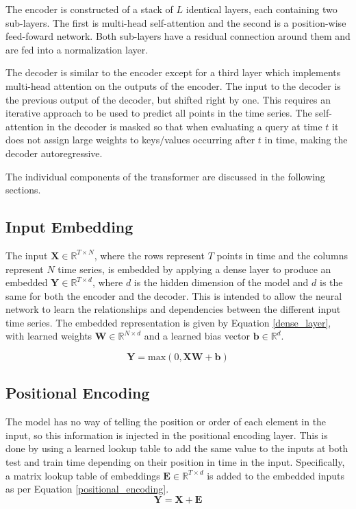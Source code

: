 The encoder is constructed of a stack of $L$ identical layers, each containing two sub-layers.
The first is multi-head self-attention and the second is a position-wise feed-foward network.
Both sub-layers have a residual connection around them and are fed into a normalization layer.

The decoder is similar to the encoder except for a third layer which implements multi-head attention on the outputs of the encoder.
The input to the decoder is the previous output of the decoder, but shifted right by one.
This requires an iterative approach to be used to predict all points in the time series.
The self-attention in the decoder is masked so that when evaluating a query at time $t$ it does not assign large weights to keys/values occurring after $t$ in time, making the decoder autoregressive.

The individual components of the transformer are discussed in the following sections.

\subsection{Input Embedding}
The input $\boldsymbol{X} \in \mathbb{R}^{T \times N}$, where the rows represent $T$ points in time and the columns represent $N$ time series, is embedded by applying a dense layer to produce an embedded $\boldsymbol{Y} \in \mathbb{R}^{T \times d}$, where $d$ is the hidden dimension of the model and $d$ is the same for both the encoder and the decoder.
This is intended to allow the neural network to learn the relationships and dependencies between the different input time series.
The embedded representation is given by Equation \ref{dense_layer}, with learned weights $\boldsymbol{W} \in \mathbb{R}^{N \times d}$ and a learned bias vector $\boldsymbol{b} \in \mathbb{R}^{d}$.

\begin{equation} \label{dense_layer}
\boldsymbol{Y} = \text{max}(0, \boldsymbol{XW} + \boldsymbol{b})
\end{equation}

\subsection{Positional Encoding}
The model has no way of telling the position or order of each element in the input, so this information is injected in the positional encoding layer.
This is done by using a learned lookup table to add the same value to the inputs at both test and train time depending on their position in time in the input.
Specifically, a matrix lookup table of embeddings $\boldsymbol{E} \in \mathbb{R}^{T \times d}$ is added to the embedded inputs as per Equation \ref{positional_encoding}.
\begin{equation}\label{positional_encoding}
\boldsymbol{Y} = \boldsymbol{X} + \boldsymbol{E}
\end{equation}

